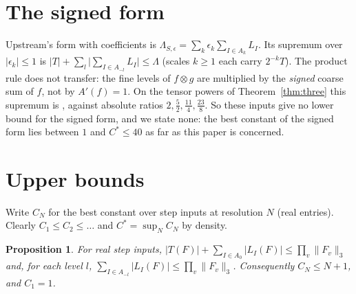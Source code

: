 \documentclass[11pt]{article}
\newtheorem{proposition}[theorem]{Proposition}
\theoremstyle{remark}
\newcommand{\Lam}{\Lambda}
\begin{document}
\section{The signed form}\label{sec:signed}

Upstream's form with coefficients is $\Lam_{S,\epsilon}=\sum_k\epsilon_k\sum_{I\in A_k}L_I$. Its supremum over
$|\epsilon_k|\le1$ is $|T|+\sum_{l}\big|\sum_{I\in A_{-l}}L_I\big|\le\Lam$ (scales $k\ge1$ each carry $2^{-k}T$). The product
rule does not transfer: the fine levels of $f\otimes g$ are multiplied by the \emph{signed} coarse sum of $f$, not by
$A'(f)=1$. On the tensor powers of Theorem~\ref{thm:three} this supremum is
\signedRowsText, against absolute ratios $2,\tfrac52,\tfrac{11}4,\tfrac{23}8$. So these inputs give no lower bound for the
signed form, and we state none: the best constant of the signed form lies between $1$ and $C^\ast\le40$ as far as this
paper is concerned.

\section{Upper bounds}\label{sec:upper}

Write $C_N$ for the best constant over step inputs at resolution $N$ (real entries). Clearly $C_1\le C_2\le\dots$ and
$C^\ast=\sup_NC_N$ by density.

\begin{proposition}\label{prop:level}
For real step inputs, $|T(F)|+\sum_{I\in A_0}|L_I(F)|\le\prod_v\|F_v\|_3$ and, for each level $l$,
$\sum_{I\in A_{-l}}|L_I(F)|\le\prod_v\|F_v\|_3$. Consequently $C_N\le N+1$, and $C_1=1$.
\end{proposition}
\end{document}
